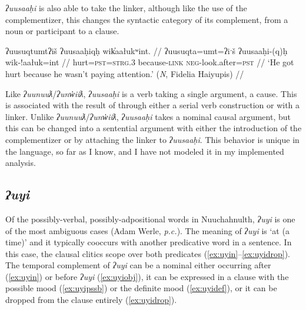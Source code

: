 \textit{ʔuusaaḥi} is also able to take the linker, although like the use of the complementizer, this changes the syntactic category of its complement, from a noun or participant to a clause.

\ex \label{ex:uusahiqh}
\begingl
\glpreamble ʔuusuqtumtʔiš ʔuusaaḥiqḥ wik̓aałukʷint. //
\gla ʔuusuqta=umt=ʔiˑš ʔuusaaḥi-(q)ḥ wik-!aałuk=int //
\glb hurt=\textsc{pst}=\textsc{strg.3} because-\textsc{link} \textsc{neg}-look.after=\textsc{pst}  //
\glft `He got hurt because he wasn't paying attention.' (\textit{N}, Fidelia Haiyupis) //
\endgl
\xe



Like \textit{ʔuunuuƛ}/\textit{ʔunw̓iiƛ}, \textit{ʔuusaaḥi} is a verb taking a single argument, a cause. This is associated with the result of through either a serial verb construction or with a linker. Unlike \textit{ʔuunuuƛ}/\textit{ʔunw̓iiƛ}, \textit{ʔuusaaḥi} takes a nominal causal argument, but this can be changed into a sentential argument with either the introduction of the complementizer or by attaching the linker to \textit{ʔuusaaḥi}. This behavior is unique in the language, so far as I know, and I have not modeled it in my implemented analysis.

\subsection{\textit{ʔuyi}} \label{ch:link:uyi}

Of the possibly-verbal, possibly-adpositional words in Nuuchahnulth, \textit{ʔuyi} is one of the most ambiguous cases (Adam Werle, \textit{p.c.}). The meaning of \textit{ʔuyi} is `at (a time)' and it typically cooccurs with another predicative word in a sentence. In this case, the clausal clitics scope over both predicates (\ref{ex:uyin}--\ref{ex:uyidrop}). The temporal complement of \textit{ʔuyi} can be a nominal either occurring after (\ref{ex:uyin}) or before \textit{ʔuyi} (\ref{ex:uyiobj}), it can be expressed in a clause with the possible mood (\ref{ex:uyipssb}) or the definite mood (\ref{ex:uyidef}), or it can be dropped from the clause entirely (\ref{ex:uyidrop}).

